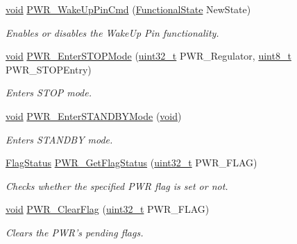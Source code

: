 \begin{DoxyCompactItemize}
\hyperlink{group___n_a_m_e_ga18028b8badbf1ea7e704ccac3c488e82}{void} \hyperlink{group___p_w_r___private___functions_gae5fd6f9336ef8c60d5483651cb0d1a00}{P\-W\-R\-\_\-\-Wake\-Up\-Pin\-Cmd} (\hyperlink{group___exported__types_gac9a7e9a35d2513ec15c3b537aaa4fba1}{Functional\-State} New\-State)
\begin{DoxyCompactList}\small\item\em Enables or disables the Wake\-Up Pin functionality. \end{DoxyCompactList}\item 
\hyperlink{group___n_a_m_e_ga18028b8badbf1ea7e704ccac3c488e82}{void} \hyperlink{group___p_w_r___private___functions_ga694676ac06a9baf50eae45adae0118ab}{P\-W\-R\-\_\-\-Enter\-S\-T\-O\-P\-Mode} (\hyperlink{stdint_8h_a435d1572bf3f880d55459d9805097f62}{uint32\-\_\-t} P\-W\-R\-\_\-\-Regulator, \hyperlink{stdint_8h_aba7bc1797add20fe3efdf37ced1182c5}{uint8\-\_\-t} P\-W\-R\-\_\-\-S\-T\-O\-P\-Entry)
\begin{DoxyCompactList}\small\item\em Enters S\-T\-O\-P mode. \end{DoxyCompactList}\item 
\hyperlink{group___n_a_m_e_ga18028b8badbf1ea7e704ccac3c488e82}{void} \hyperlink{group___p_w_r___private___functions_ga00ddae00a9c327b81b24d2597b0052f3}{P\-W\-R\-\_\-\-Enter\-S\-T\-A\-N\-D\-B\-Y\-Mode} (\hyperlink{group___n_a_m_e_ga18028b8badbf1ea7e704ccac3c488e82}{void})
\begin{DoxyCompactList}\small\item\em Enters S\-T\-A\-N\-D\-B\-Y mode. \end{DoxyCompactList}\item 
\hyperlink{group___exported__types_ga89136caac2e14c55151f527ac02daaff}{Flag\-Status} \hyperlink{group___p_w_r___private___functions_gaa980163a4d83304280ee34942464b4ec}{P\-W\-R\-\_\-\-Get\-Flag\-Status} (\hyperlink{stdint_8h_a435d1572bf3f880d55459d9805097f62}{uint32\-\_\-t} P\-W\-R\-\_\-\-F\-L\-A\-G)
\begin{DoxyCompactList}\small\item\em Checks whether the specified P\-W\-R flag is set or not. \end{DoxyCompactList}\item 
\hyperlink{group___n_a_m_e_ga18028b8badbf1ea7e704ccac3c488e82}{void} \hyperlink{group___p_w_r___private___functions_ga01c4b2fbd16514b993324e101c3ddf7c}{P\-W\-R\-\_\-\-Clear\-Flag} (\hyperlink{stdint_8h_a435d1572bf3f880d55459d9805097f62}{uint32\-\_\-t} P\-W\-R\-\_\-\-F\-L\-A\-G)
\begin{DoxyCompactList}\small\item\em Clears the P\-W\-R's pending flags. \end{DoxyCompactList}\end{DoxyCompactItemize}


